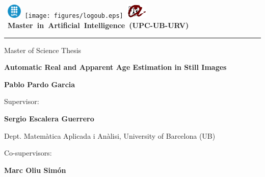 \thispagestyle{empty}
\vspace*{-2cm}

\hbox{
\includegraphics[width=0.7cm]{figures/logoupc.eps}
\texttt{[image: figures/logoub.eps]}
\includegraphics[width=1cm]{figures/logourv.eps}
\Large \bf Master in Artificial Intelligence (UPC-UB-URV)}
\hrule

\bigskip\bigskip\bigskip

\begin{center}

{\LARGE Master of Science Thesis}

\bigskip\bigskip\bigskip\bigskip\bigskip

\textbf{\huge \bf Automatic Real and Apparent Age Estimation in Still Images}

\bigskip\bigskip\bigskip\bigskip\bigskip

{\LARGE \bf Pablo Pardo Garcia}

\end{center}
\vspace*{3cm}

\begin{center}
{\large Supervisor:}
\end{center}

\medskip %

{\Large\bf Sergio Escalera Guerrero}

\medskip %

{Dept. Matemàtica Aplicada i Anàlisi, University of Barcelona (UB)}

\medskip



\bigskip %

\begin{center}
{\large Co-supervisors:}
\end{center}
	
\medskip %

{\Large\bf Marc Oliu Simón}

\medskip %

